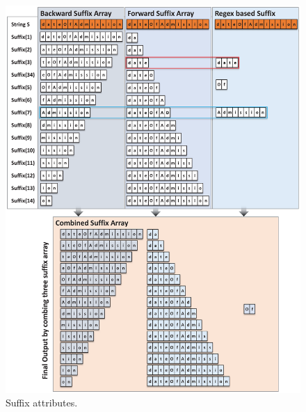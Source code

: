 \documentclass{ieeeaccess}
\begin{document}
\begin{figure}[tb!]
	\centering
	\includegraphics[scale=0.53]{suffixAttribute}
	\caption{Suffix attributes.}
	\label{fig:suffix_attribute}
\end{figure}
\end{document}
